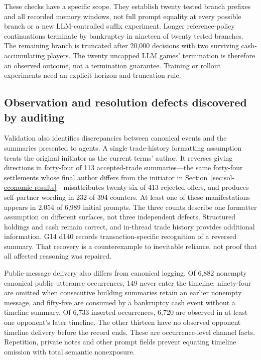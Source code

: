 These checks have a specific scope. They establish twenty tested branch prefixes and all recorded memory windows, not full prompt equality at every possible branch or a new LLM-controlled suffix experiment. Longer reference-policy continuations terminate by bankruptcy in nineteen of twenty tested branches. The remaining branch is truncated after 20,000 decisions with two surviving cash-accumulating players. The twenty uncapped LLM games' termination is therefore an observed outcome, not a termination guarantee. Training or rollout experiments need an explicit horizon and truncation rule.

\subsection{Observation and resolution defects discovered by auditing}

Validation also identifies discrepancies between canonical events and the summaries presented to agents. A single trade-history formatting assumption treats the original initiator as the current terms' author. It reverses giving directions in forty-four of 113 accepted-trade summaries---the same forty-four settlements whose final author differs from the initiator in Section~\ref{sec:sol-economic-results}---misattributes twenty-six of 413 rejected offers, and produces self-partner wording in 232 of 394 counters. At least one of these manifestations appears in 2,054 of 6,989 initial prompts. The three counts describe one formatter assumption on different surfaces, not three independent defects. Structured holdings and cash remain correct, and in-thread trade history provides additional information. G14 d140 records transaction-specific recognition of a reversed summary. That recovery is a counterexample to inevitable reliance, not proof that all affected reasoning was repaired.

Public-message delivery also differs from canonical logging. Of 6,882 nonempty canonical public utterance occurrences, 149 never enter the timeline: ninety-four are omitted when consecutive building summaries retain an earlier nonempty message, and fifty-five are consumed by a bankruptcy cash event without a timeline summary. Of 6,733 inserted occurrences, 6,720 are observed in at least one opponent's later timeline. The other thirteen have no observed opponent timeline delivery before the record ends. These are occurrence-level channel facts. Repetition, private notes and other prompt fields prevent equating timeline omission with total semantic nonexposure.

